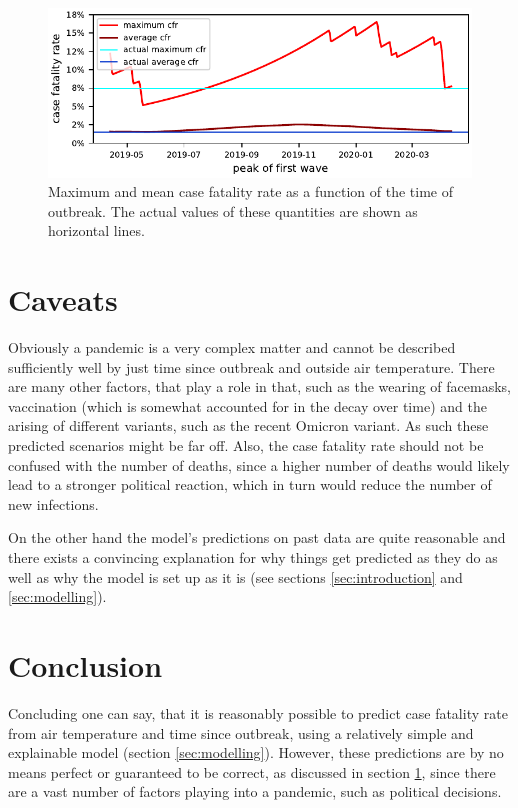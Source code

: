 \documentclass{article}
\begin{document}
\begin{figure}[hbt!]
  \begin{center}
    \includegraphics{../fig/MaxMeanCfr.pdf}
    \caption{Maximum and mean case fatality rate as a function of the time of outbreak. The actual values of these quantities are shown as horizontal lines.}
    \label{fig:max_mean_cfr}
  \end{center}
\end{figure}

\section{Caveats}
\label{sec:caveats}

Obviously a pandemic is a very complex matter and cannot be described sufficiently well by just time since outbreak and outside air temperature. There are many other factors, that play a role in that, such as the wearing of facemasks, vaccination (which is somewhat accounted for in the decay over time) and the arising of different variants, such as the recent Omicron variant. As such these predicted scenarios might be far off. Also, the case fatality rate should not be confused with the number of deaths, since a higher number of deaths would likely lead to a stronger political reaction, which in turn would reduce the number of new infections. 

On the other hand the model's predictions on past data are quite reasonable and there exists a convincing explanation for why things get predicted as they do as well as why the model is set up as it is (see sections \ref{sec:introduction} and \ref{sec:modelling}).

\section{Conclusion}

Concluding one can say, that it is reasonably possible to predict case fatality rate from air temperature and time since outbreak, using a relatively simple and explainable model (section \ref{sec:modelling}). However, these predictions are by no means perfect or guaranteed to be correct, as discussed in section \ref{sec:caveats}, since there are a vast number of factors playing into a pandemic, such as political decisions. 
\end{document}
